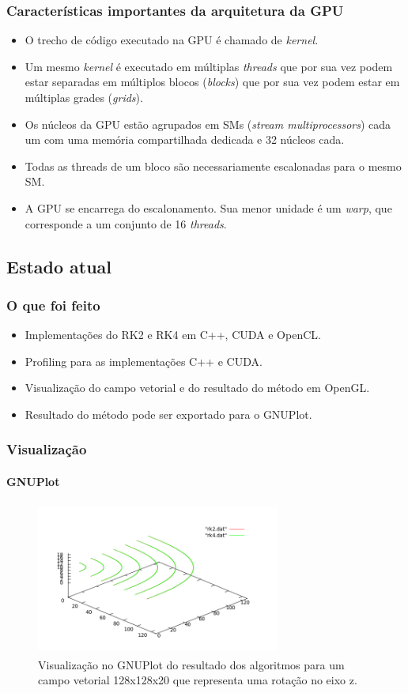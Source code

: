\documentclass[brazil]{beamer}
\begin{document}
\begin{frame}
  \frametitle{Características importantes da arquitetura da GPU}
  
  \begin{itemize}
    \item O trecho de código executado na GPU é chamado de \textit{kernel}.
    \item Um mesmo \textit{kernel} é executado em múltiplas \textit{threads} que por sua vez podem estar separadas em múltiplos blocos (\textit{blocks}) que por sua vez podem estar em múltiplas grades (\textit{grids}).
    \item Os núcleos da GPU estão agrupados em SMs (\textit{stream multiprocessors}) cada um com uma memória compartilhada dedicada e 32 núcleos cada.
    \item Todas as threads de um bloco são necessariamente escalonadas para o mesmo SM.
    \item A GPU se encarrega do escalonamento. Sua menor unidade é um \textit{warp}, que corresponde a um conjunto de 16 \textit{threads}.
  \end{itemize}
\end{frame}

\subsection{Estado atual}
\begin{frame}
  \frametitle{O que foi feito}

  \begin{itemize}
    \item Implementações do RK2 e RK4 em C++, CUDA e OpenCL.
    \item Profiling para as implementações C++ e CUDA.
    \item Visualização do campo vetorial e do resultado do método em OpenGL.
    \item Resultado do método pode ser exportado para o GNUPlot.
  \end{itemize}
\end{frame}

\begin{frame}
  \frametitle{Visualização}
  \framesubtitle{GNUPlot}
  
    \begin{figure}
    \begin{center}
      \includegraphics[width=80mm, height=50mm]{rk2-vs-rk4.png}
      \caption{Visualização no GNUPlot do resultado dos algoritmos para um campo vetorial 128x128x20 que representa uma rotação no eixo z.}
    \end{center}
  \end{figure}
\end{frame}
\end{document}
